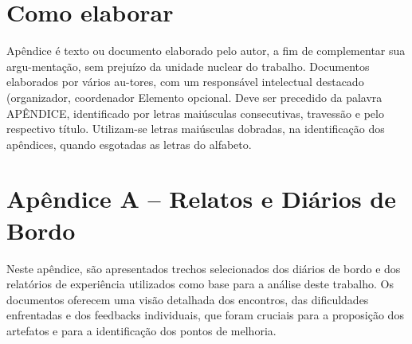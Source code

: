 %
%

\begin{apendicesenv}

\chapter{Como elaborar}

Apêndice é texto ou documento elaborado pelo autor, a fim de
complementar sua argu-mentação, sem prejuízo da unidade nuclear do trabalho. Documentos elaborados por vários au-tores, com um responsável intelectual destacado (organizador, coordenador Elemento opcional.  Deve ser precedido da palavra APÊNDICE, identificado por letras maiúsculas consecutivas, travessão e pelo respectivo título. Utilizam-se letras maiúsculas dobradas, na identificação dos apêndices, quando esgotadas as letras do alfabeto.

\chapter{Apêndice A – Relatos e Diários de Bordo}
\label{chap:apendiceA}
Neste apêndice, são apresentados trechos selecionados dos diários de bordo e dos relatórios de experiência utilizados como base para a análise deste trabalho. Os documentos \cite{rel_danrley_core_2024, rel_labtech_2024_1, rel_labtech_2023_2, rel_lelton_eventos_2024, rel_polyana_2024} oferecem uma visão detalhada dos encontros, das dificuldades enfrentadas e dos feedbacks individuais, que foram cruciais para a proposição dos artefatos e para a identificação dos pontos de melhoria.

\end{apendicesenv}
